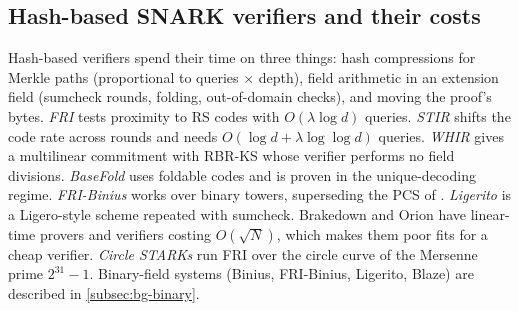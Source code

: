\subsection{Hash-based SNARK verifiers and their costs}\label{subsec:bg-costs}

Hash-based verifiers spend their time on three things: hash compressions for Merkle paths
(proportional to queries $\times$ depth), field arithmetic in an extension field (sumcheck rounds,
folding, out-of-domain checks), and moving the proof's bytes. \emph{FRI}
\cite{BBHR18-FRI,BGKS20-DEEPFRI} tests proximity to RS codes with $O(\lambda\log d)$ queries.
\emph{STIR} \cite{ACFY24-STIR} shifts the code rate across rounds and needs
$O(\log d+\lambda\log\log d)$ queries. \emph{WHIR} \cite{ACFY24-WHIR} gives a multilinear
commitment with RBR-KS whose verifier performs no field divisions. \emph{BaseFold}
\cite{ZCF24-BaseFold} uses foldable codes and is proven in the unique-decoding regime.
\emph{FRI-Binius} \cite{DP24-FRIBinius} works over binary towers, superseding the PCS of
\cite{DP23-Binius}. \emph{Ligerito} \cite{NA25-Ligerito} is a Ligero-style \cite{AHIV17-Ligero}
scheme repeated with sumcheck. Brakedown \cite{GLSTW23-Brakedown} and Orion \cite{XZS22-Orion}
have linear-time provers and verifiers costing $O(\sqrt N)$, which makes them poor fits for a cheap
verifier. \emph{Circle STARKs} \cite{HLP24-Circle} run FRI over the circle curve of the Mersenne
prime $2^{31}-1$. Binary-field systems (Binius, FRI-Binius, Ligerito, Blaze) are described in
\cref{subsec:bg-binary}.

